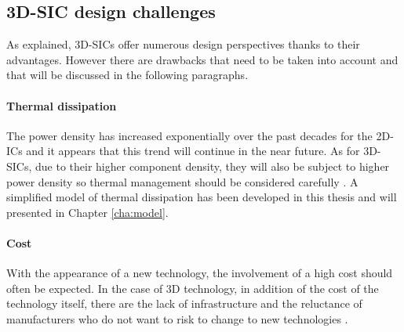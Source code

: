 
\subsection{3D-SIC design challenges}

As explained, 3D-SICs offer numerous design perspectives thanks to their advantages. However there are drawbacks that need to be taken into account and that will be discussed in the following paragraphs.

\paragraph{Thermal dissipation}
The power density has increased exponentially over the past decades for the 2D-ICs and it appears that this trend will continue in the near future. As for 3D-SICs, due to their higher component density, they will also be subject to higher power density so thermal management should be considered carefully \cite{659500}. A simplified model of thermal dissipation has been developed in this thesis and will presented in Chapter \ref{cha:model}.

\paragraph{Cost}
With the appearance of a new technology, the involvement of a high cost should often be expected. In the case of 3D technology, in addition of the cost of the technology itself, there are the lack of infrastructure and the reluctance of manufacturers who do not want to risk to change to new technologies \cite{659500}.

